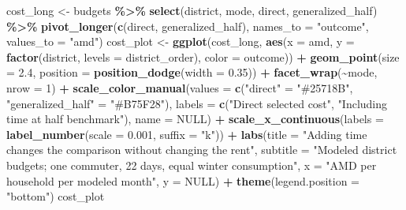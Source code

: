 \documentclass[
]{article}
\newenvironment{Shaded}{\begin{snugshade}}{\end{snugshade}}
\newcommand{\AttributeTok}[1]{\textcolor[rgb]{0.13,0.29,0.53}{#1}}
\newcommand{\ConstantTok}[1]{\textcolor[rgb]{0.56,0.35,0.01}{#1}}
\newcommand{\DecValTok}[1]{\textcolor[rgb]{0.00,0.00,0.81}{#1}}
\newcommand{\FloatTok}[1]{\textcolor[rgb]{0.00,0.00,0.81}{#1}}
\newcommand{\FunctionTok}[1]{\textcolor[rgb]{0.13,0.29,0.53}{\textbf{#1}}}
\newcommand{\NormalTok}[1]{#1}
\newcommand{\OtherTok}[1]{\textcolor[rgb]{0.56,0.35,0.01}{#1}}
\newcommand{\SpecialCharTok}[1]{\textcolor[rgb]{0.81,0.36,0.00}{\textbf{#1}}}
\newcommand{\StringTok}[1]{\textcolor[rgb]{0.31,0.60,0.02}{#1}}
\begin{document}
\begin{Shaded}
\begin{Highlighting}[]
\NormalTok{cost\_long }\OtherTok{\textless{}{-}}\NormalTok{ budgets }\SpecialCharTok{\%\textgreater{}\%} \FunctionTok{select}\NormalTok{(district, mode, direct, generalized\_half) }\SpecialCharTok{\%\textgreater{}\%}
  \FunctionTok{pivot\_longer}\NormalTok{(}\FunctionTok{c}\NormalTok{(direct, generalized\_half), }\AttributeTok{names\_to =} \StringTok{"outcome"}\NormalTok{, }\AttributeTok{values\_to =} \StringTok{"amd"}\NormalTok{)}
\NormalTok{cost\_plot }\OtherTok{\textless{}{-}} \FunctionTok{ggplot}\NormalTok{(cost\_long, }\FunctionTok{aes}\NormalTok{(}\AttributeTok{x =}\NormalTok{ amd, }\AttributeTok{y =} \FunctionTok{factor}\NormalTok{(district, }\AttributeTok{levels =}\NormalTok{ district\_order), }\AttributeTok{color =}\NormalTok{ outcome)) }\SpecialCharTok{+}
  \FunctionTok{geom\_point}\NormalTok{(}\AttributeTok{size =} \FloatTok{2.4}\NormalTok{, }\AttributeTok{position =} \FunctionTok{position\_dodge}\NormalTok{(}\AttributeTok{width =} \FloatTok{0.35}\NormalTok{)) }\SpecialCharTok{+}
  \FunctionTok{facet\_wrap}\NormalTok{(}\SpecialCharTok{\textasciitilde{}}\NormalTok{mode, }\AttributeTok{nrow =} \DecValTok{1}\NormalTok{) }\SpecialCharTok{+}
  \FunctionTok{scale\_color\_manual}\NormalTok{(}\AttributeTok{values =} \FunctionTok{c}\NormalTok{(}\StringTok{"direct"} \OtherTok{=} \StringTok{"\#25718B"}\NormalTok{, }\StringTok{"generalized\_half"} \OtherTok{=} \StringTok{"\#B75F28"}\NormalTok{),}
    \AttributeTok{labels =} \FunctionTok{c}\NormalTok{(}\StringTok{"Direct selected cost"}\NormalTok{, }\StringTok{"Including time at half benchmark"}\NormalTok{), }\AttributeTok{name =} \ConstantTok{NULL}\NormalTok{) }\SpecialCharTok{+}
  \FunctionTok{scale\_x\_continuous}\NormalTok{(}\AttributeTok{labels =} \FunctionTok{label\_number}\NormalTok{(}\AttributeTok{scale =} \FloatTok{0.001}\NormalTok{, }\AttributeTok{suffix =} \StringTok{"k"}\NormalTok{)) }\SpecialCharTok{+}
  \FunctionTok{labs}\NormalTok{(}\AttributeTok{title =} \StringTok{"Adding time changes the comparison without changing the rent"}\NormalTok{,}
       \AttributeTok{subtitle =} \StringTok{"Modeled district budgets; one commuter, 22 days, equal winter consumption"}\NormalTok{,}
       \AttributeTok{x =} \StringTok{"AMD per household per modeled month"}\NormalTok{, }\AttributeTok{y =} \ConstantTok{NULL}\NormalTok{) }\SpecialCharTok{+} \FunctionTok{theme}\NormalTok{(}\AttributeTok{legend.position =} \StringTok{"bottom"}\NormalTok{)}
\NormalTok{cost\_plot}
\end{Highlighting}
\end{Shaded}
\end{document}
